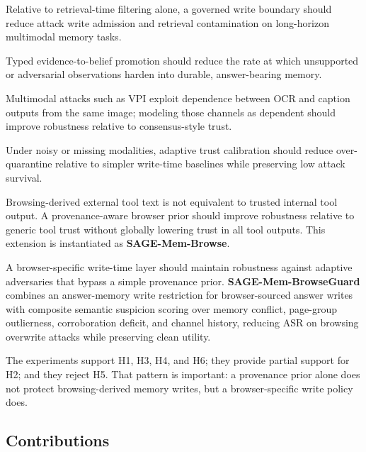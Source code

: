 \documentclass{article}
\begin{document}
\begin{description}[style=nextline,leftmargin=0pt,labelsep=0.4em,font=\normalfont\bfseries]
\item[H1: Write-time governance hypothesis.] Relative to retrieval-time filtering alone, a governed write boundary should reduce attack write admission and retrieval contamination on long-horizon multimodal memory tasks.
\item[H2: Belief-formation hypothesis.] Typed evidence-to-belief promotion should reduce the rate at which unsupported or adversarial observations harden into durable, answer-bearing memory.
\item[H3: Dependent-evidence hypothesis.] Multimodal attacks such as VPI exploit dependence between OCR and caption outputs from the same image; modeling those channels as dependent should improve robustness relative to consensus-style trust.
\item[H4: Noise-calibration hypothesis.] Under noisy or missing modalities, adaptive trust calibration should reduce over-quarantine relative to simpler write-time baselines while preserving low attack survival.
\item[H5: Browsing-context prior hypothesis.] Browsing-derived external tool text is not equivalent to trusted internal tool output. A provenance-aware browser prior should improve robustness relative to generic tool trust without globally lowering trust in all tool outputs. This extension is instantiated as \textbf{SAGE-Mem-Browse}.
\item[H6: Browsing-guard hypothesis.] A browser-specific write-time layer should maintain robustness against adaptive adversaries that bypass a simple provenance prior. \textbf{SAGE-Mem-BrowseGuard} combines an answer-memory write restriction for browser-sourced answer writes with composite semantic suspicion scoring over memory conflict, page-group outlierness, corroboration deficit, and channel history, reducing ASR on browsing overwrite attacks while preserving clean utility.
\end{description}

The experiments support H1, H3, H4, and H6; they provide partial support for H2; and they reject H5. That pattern is important: a provenance prior alone does not protect browsing-derived memory writes, but a browser-specific write policy does.

\subsection{Contributions}
\end{document}
